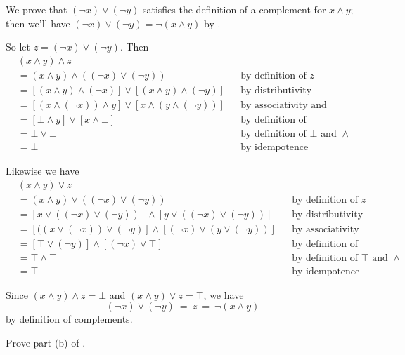 \begin{cproof}[of {(a)}]
We prove that $(\neg x) \vee (\neg y)$ satisfies the definition of a complement for $x \wedge y$; then we'll have $(\neg x) \vee (\neg y) = \neg (x \wedge y)$ by .

So let $z = (\neg x) \vee (\neg y)$. Then
\begin{align*}
&  (x \wedge y) \wedge z && \\
&= (x \wedge y) \wedge ((\neg x) \vee (\neg y)) && \text{by definition of $z$} \\
&= [(x \wedge y) \wedge (\neg x)] \vee [(x \wedge y) \wedge (\neg y)] && \text{by distributivity} \\
&= [(x \wedge (\neg x)) \wedge y] \vee [x \wedge (y \wedge (\neg y))] && \text{by associativity and commutativity} \\
&= [\bot \wedge y] \vee [x \wedge \bot] && \text{by definition of complements} \\
&= \bot \vee \bot && \text{by definition of $\bot$ and $\wedge$} \\
&= \bot && \text{by idempotence}
\end{align*}

Likewise we have
\begin{align*}
&  (x \wedge y) \vee z && \\
&= (x \wedge y) \vee ((\neg x) \vee (\neg y)) && \text{by definition of $z$} \\
&= [x \vee ((\neg x) \vee (\neg y))] \wedge [y \vee ((\neg x) \vee (\neg y))] && \text{by distributivity} \\
&= [((x \vee (\neg x)) \vee (\neg y)] \wedge [(\neg x) \vee (y \vee (\neg y))] && \text{by associativity and commutativity} \\
&= [\top \vee (\neg y)] \wedge [(\neg x) \vee \top] && \text{by definition of complements} \\
&= \top \wedge \top && \text{by definition of $\top$ and $\wedge$} \\
&= \top && \text{by idempotence}
\end{align*}

Since $(x \wedge y) \wedge z = \bot$ and $(x \wedge y) \vee z = \top$, we have
\[ (\neg x) \vee (\neg y) ~=~ z ~=~ \neg (x \wedge y) \]
by definition of complements.
\end{cproof}

\begin{exercise}
Prove part (b) of .

\end{exercise}
